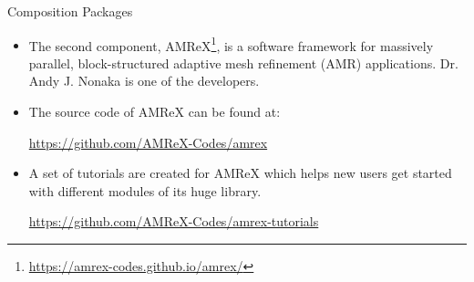 \documentclass[\string~/GitHub/sthlmNordBeamerTheme/sthlmNordLightDemo.tex]{subfiles}
\begin{document}
\begin{frame}[c]{Composition Packages}

    \begin{itemize}
		
        \item The second component, AMReX\footnote{\url{https://amrex-codes.github.io/amrex/}}, is a software framework for massively parallel, block-structured adaptive mesh refinement (AMR) applications. Dr. Andy J. Nonaka is one of the developers.
        
        \item The source code of AMReX can be found at:
            \begin{center}
                \url{https://github.com/AMReX-Codes/amrex}
            \end{center}

        \item A set of tutorials are created for AMReX which helps new users get started with different modules of its huge library.
            \begin{center}
                \url{https://github.com/AMReX-Codes/amrex-tutorials}
            \end{center}
            
    \end{itemize}
 
\end{frame}
\end{document}
